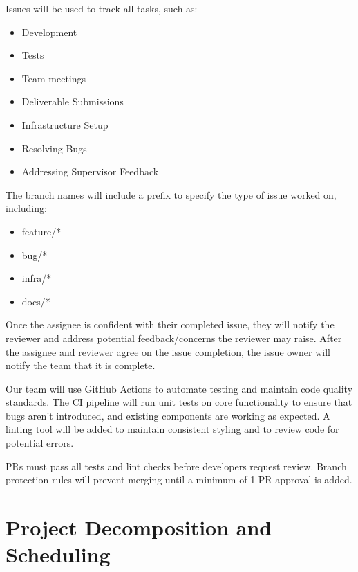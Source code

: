 \documentclass{article}
\begin{document}
Issues will be used to track all tasks, such as:
\begin{itemize}
    \item Development
    \item Tests
    \item Team meetings
    \item Deliverable Submissions
    \item Infrastructure Setup
    \item Resolving Bugs
    \item Addressing Supervisor Feedback
\end{itemize}

The branch names will include a prefix to specify the type of issue worked on, including:
\begin{itemize}
    \item feature/*
    \item bug/*
    \item infra/*
    \item docs/*
\end{itemize}

Once the assignee is confident with their completed issue, they will notify the reviewer and address potential feedback/concerns the reviewer may raise. After the assignee and reviewer agree on the issue completion, the issue owner will notify the team that it is complete.


Our team will use GitHub Actions to automate testing and maintain code quality standards. The CI pipeline will run unit tests on core functionality to ensure that bugs aren’t introduced, and existing components are working as expected. A linting tool will be added to maintain consistent styling and to review code for potential errors.

PRs must pass all tests and lint checks before developers request review. Branch protection rules will prevent merging until a minimum of 1 PR approval is added.

\section{Project Decomposition and Scheduling}
\begin{comment}
\begin{itemize}
  \item How will you be using GitHub projects?
  \item Include a link to your GitHub project
\end{itemize}

\wss{How will the project be scheduled?  This is the big picture schedule, not
details. You will need to reproduce information that is in the course outline
for deadlines.}
\end{comment}
\end{document}

